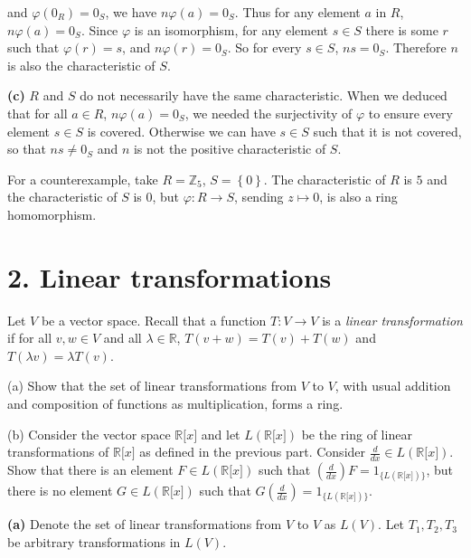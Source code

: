 and \(\varphi\left( 0_{R} \right) = 0_{S}\), we have \(n\varphi(a) = 0_{S}\). Thus for any element \(a\) in \(R\), \(n\varphi(a) = 0_{S}\). Since \(\varphi\) is an isomorphism, for any element \(s \in S\) there is some \(r\) such that \(\varphi(r) = s\), and \(n\varphi(r) = 0_{S}\). So for every \(s \in S\), \(ns = 0_{S}\). Therefore \(n\) is also the characteristic of \(S\).

\textbf{(c)} \(R\) and \(S\) do not necessarily have the same characteristic. When we deduced that for all \(a \in R\), \(n\varphi(a) = 0_{S}\), we needed the surjectivity of \(\varphi\) to ensure every element \(s \in S\) is covered. Otherwise we can have \(s \in S\) such that it is not covered, so that \(ns \neq 0_{S}\) and \(n\) is not the positive characteristic of \(S\).

For a counterexample, take \(R = \mathbb{Z}_{5}\), \(S = \left\{ 0 \right\}\). The characteristic of \(R\) is \(5\) and the characteristic of \(S\) is \(0\), but \(\varphi:R\rightarrow S\), sending \(z\mapsto 0\), is also a ring homomorphism.

\section{2. Linear transformations}

Let \(V\) be a vector space. Recall that a function \(T:V\rightarrow V\) is a \emph{linear transformation} if for all \(v,w \in V\) and all \(\lambda \in \mathbb{R}\), \(T\left( {v + w} \right) = T(v) + T(w)\) and \(T\left( {\lambda v} \right) = \lambda T(v)\).

(a) Show that the set of linear transformations from \(V\) to \(V\), with usual addition and composition of functions as multiplication, forms a ring.

(b) Consider the vector space \(\mathbb{R}\lbrack x\rbrack\) and let \(L\left( {\mathbb{R}\lbrack x\rbrack} \right)\) be the ring of linear transformations of \(\mathbb{R}\lbrack x\rbrack\) as defined in the previous part. Consider \(\frac{d}{dx} \in L\left( {\mathbb{R}\lbrack x\rbrack} \right)\). Show that there is an element \(F \in L\left( {\mathbb{R}\lbrack x\rbrack} \right)\) such that \(\left( \frac{d}{dx} \right)F = 1_{\{{L{({\mathbb{R}{\lbrack x\rbrack}})}}\}}\), but there is no element \(G \in L\left( {\mathbb{R}\lbrack x\rbrack} \right)\) such that \(G\left( \frac{d}{dx} \right) = 1_{\{{L{({\mathbb{R}{\lbrack x\rbrack}})}}\}}\).

\textbf{(a)} Denote the set of linear transformations from \(V\) to \(V\) as \(L(V)\). Let \(T_{1},T_{2},T_{3}\) be arbitrary transformations in \(L(V)\).

